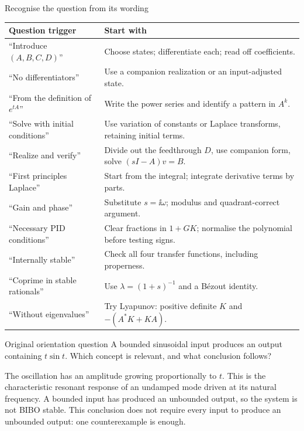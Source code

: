 \begin{method}{Recognise the question from its wording}
\begin{tabular}{p{.34\linewidth}p{.59\linewidth}}
\textbf{Question trigger}&\textbf{Start with}\\ \hline
``Introduce $(A,B,C,D)$''&Choose states; differentiate each; read off coefficients.\\
``No differentiators''&Use a companion realization or an input-adjusted state.\\
``From the definition of $e^{tA}$''&Write the power series and identify a pattern in $A^k$.\\
``Solve with initial conditions''&Use variation of constants or Laplace transforms, retaining initial terms.\\
``Realize and verify''&Divide out the feedthrough $D$, use companion form, solve $(sI-A)v=B$.\\
``First principles Laplace''&Start from the integral; integrate derivative terms by parts.\\
``Gain and phase''&Substitute $s=\ii\omega$; modulus and quadrant-correct argument.\\
``Necessary PID conditions''&Clear fractions in $1+GK$; normalise the polynomial before testing signs.\\
``Internally stable''&Check all four transfer functions, including properness.\\
``Coprime in stable rationals''&Use $\lambda=(1+s)^{-1}$ and a B\'ezout identity.\\
``Without eigenvalues''&Try Lyapunov: positive definite $K$ and $-(A^*K+KA)$.\\
\end{tabular}
\end{method}
\begin{question}{Original orientation question}
A bounded sinusoidal input produces an output containing $t\sin t$. Which concept is relevant, and what conclusion follows?
\end{question}
\begin{answer}
The oscillation has an amplitude growing proportionally to $t$. This is the characteristic resonant response of an undamped mode driven at its natural frequency. A bounded input has produced an unbounded output, so the system is not BIBO stable. This conclusion does not require every input to produce an unbounded output: one counterexample is enough.
\end{answer}


